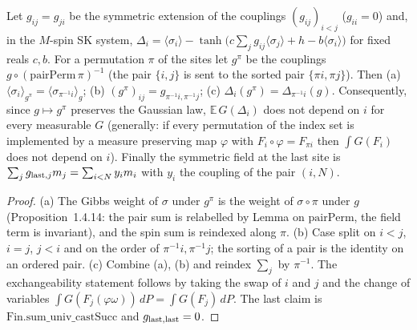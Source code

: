 \begin{lemma}
\label{lem:sg-tal:tap-exchange}
  \leanok
{}
Let $g_{ij}=g_{ji}$ be the symmetric extension of the couplings $(g_{ij})_{i<j}$ ($g_{ii}=0$) and, in the $M$-spin SK system, $\Delta_i=\langle\sigma_i\rangle-\tanh\bigl(c\sum_jg_{ij}\langle\sigma_j\rangle+h-b\langle\sigma_i\rangle\bigr)$ for fixed reals $c,b$.  For a permutation $\pi$ of the sites let $g^\pi$ be the couplings $g\circ(\mathrm{pairPerm}\,\pi)^{-1}$ (the pair $\{i,j\}$ is sent to the sorted pair $\{\pi i,\pi j\}$).  Then (a) $\langle\sigma_i\rangle_{g^\pi}=\langle\sigma_{\pi^{-1}i}\rangle_g$; (b) $(g^\pi)_{ij}=g_{\pi^{-1}i,\pi^{-1}j}$; (c) $\Delta_i(g^\pi)=\Delta_{\pi^{-1}i}(g)$.  Consequently, since $g\mapsto g^\pi$ preserves the Gaussian law, $\mathbb E\,G(\Delta_i)$ does not depend on $i$ for every measurable $G$ (generally: if every permutation of the index set is implemented by a measure preserving map $\varphi$ with $F_i\circ\varphi=F_{\pi i}$ then $\int G(F_i)$ does not depend on $i$).  Finally the symmetric field at the last site is $\sum_jg_{{\rm last},j}m_j=\sum_{i<N}y_im_i$ with $y_i$ the coupling of the pair $(i,N)$.
\end{lemma}
\begin{proof}
  \leanok
(a) The Gibbs weight of $\sigma$ under $g^\pi$ is the weight of $\sigma\circ\pi$ under $g$ (Proposition~1.4.14: the pair sum is relabelled by Lemma on $\mathrm{pairPerm}$, the field term is invariant), and the spin sum is reindexed along $\pi$.  (b) Case split on $i<j$, $i=j$, $j<i$ and on the order of $\pi^{-1}i,\pi^{-1}j$; the sorting of a pair is the identity on an ordered pair.  (c) Combine (a), (b) and reindex $\sum_j$ by $\pi^{-1}$.  The exchangeability statement follows by taking the swap of $i$ and $j$ and the change of variables $\int G(F_j(\varphi\omega))\,dP=\int G(F_j)\,dP$.  The last claim is $\mathrm{Fin.sum\_univ\_castSucc}$ and $g_{\rm last,last}=0$.
\end{proof}

